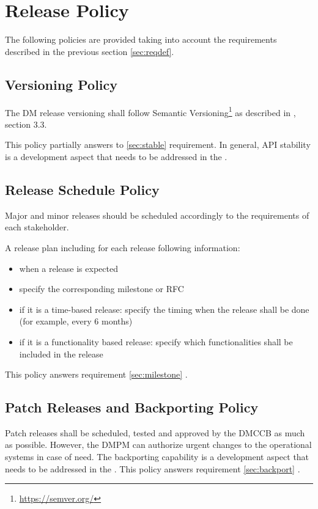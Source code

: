 \section{Release Policy} \label{sec:policy}

The following policies are provided taking into account the requirements described in the previous section \ref{sec:reqdef}.


\subsection{Versioning Policy} \label{sec:versinopolicy}

The DM release versioning shall follow Semantic Versioning\footnote{\url{https://semver.org/}} as described in , section 3.3.

This policy partially answers to \ref{sec:stable} requirement.
In general, API stability is a development aspect that needs to be addressed in the .


\subsection{Release Schedule Policy} \label{sec:schedulepolicy}

Major and minor releases should be scheduled accordingly to the requirements of each stakeholder.

A release plan including for each release following information:

\begin{itemize}
\item when a release is expected
\item specify the corresponding milestone or RFC
\item if it is a time-based release: specify the timing when the release shall be done (for example, every 6 months)
\item if it is a functionality based release: specify which functionalities shall be included in the release
\end{itemize}

This policy answers requirement \ref{sec:milestone} .


\subsection{Patch Releases and Backporting Policy} \label{sec:patchpolicy}

Patch releases shall be scheduled, tested and approved by the DMCCB as much as possible.
However, the DMPM can authorize urgent changes to the operational systems in case of need.
The backporting capability is a development aspect that needs to be addressed in the .
This policy answers requirement  \ref{sec:backport} .


